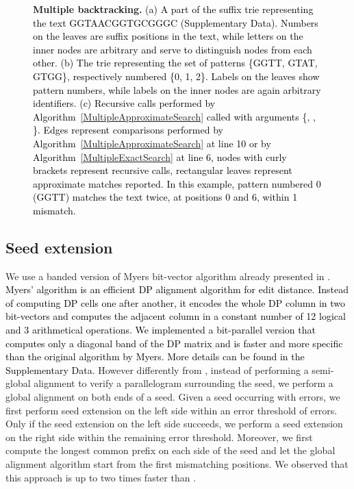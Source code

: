 \documentclass[a4,center,fleqn]{article}
\begin{document}
\begin{figure}[h]
\centering
\vspace{5mm}
\hspace{10mm}
\hspace{10mm}
\caption{
{\bfseries Multiple backtracking.}
\textcolor{black}
{
(a) A part of the suffix trie representing the text GGTAACGGTGCGGGC (Supplementary Data). Numbers on the leaves are suffix positions in the text, while letters on the inner nodes are arbitrary and serve to distinguish nodes from each other.
(b) The trie representing the set of patterns \{GGTT, GTAT, GTGG\}, respectively numbered \{0, 1, 2\}. Labels on the leaves show pattern numbers, while labels on the inner nodes are again arbitrary identifiers.
(c) Recursive calls performed by Algorithm~\ref{MultipleApproximateSearch} called with arguments \{, , \}. Edges represent comparisons performed by Algorithm~\ref{MultipleApproximateSearch} at line 10 or by Algorithm~\ref{MultipleExactSearch} at line 6, nodes with curly brackets represent recursive calls, rectangular leaves represent approximate matches reported.
In this example, pattern numbered 0 (GGTT) matches the text twice, at positions 0 and 6, within 1 mismatch.}
}

\label{fig:MSA}
\end{figure}

\subsection{Seed extension}

We use a banded version of Myers bit-vector algorithm \cite{Myers1999} already presented in \cite{Razers3}.
\textcolor{black}{
Myers' algorithm is an efficient DP alignment algorithm \cite{Needleman1970} for edit distance. 
Instead of computing DP cells one after another, it encodes the whole DP column in two bit-vectors and computes the adjacent column in a constant number of 12 logical and 3 arithmetical operations.
We implemented a bit-parallel version that computes only a diagonal band of the DP matrix and is faster and more specific than the original algorithm by Myers.
More details can be found in the Supplementary Data.
}
However differently from \cite{Razers3}, instead of performing a semi-global alignment to verify a parallelogram surrounding the seed, we perform a global alignment on both ends of a seed.
Given a seed occurring with  errors, we first perform seed extension on the left side within an error threshold of  errors.
Only if the seed extension on the left side succeeds, we perform a seed extension on the right side within the remaining error threshold.
Moreover, we first compute the longest common prefix on each side of the seed and let the global alignment algorithm start from the first mismatching positions.
We observed that this approach is up to two times faster than \cite{Razers3}.
\end{document}
